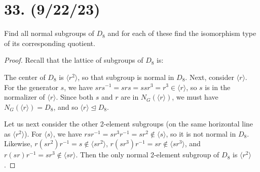 \documentclass{article}
\begin{document}
\section*{33. (9/22/23)}

Find all normal subgroups of $D_8$ and for each of these find the isomorphism type of its corresponding quotient.

\begin{proof}
    
Recall that the lattice of subgroups of $D_8$ is:

\begin{center}
\end{center}

The center of $D_8$ is $\langle r^2 \rangle$, so that subgroup is normal in $D_8$. Next, consider $\langle r \rangle$. For the generator $s$, we have $srs^{-1} = srs = ssr^3 = r^3 \in \langle r \rangle$, so $s$ is in the normalizer of $\langle r \rangle$. Since both $s$ and $r$ are in $N_G(\langle r \rangle)$, we must have $N_G(\langle r \rangle) = D_8$, and so $\langle r \rangle \unlhd D_8$.

Let us next consider the other 2-element subgroups (on the same horizontal line as $\langle r^2 \rangle$). For $\langle s \rangle$, we have $rsr^{-1} = sr^3r^{-1} = sr^2 \notin \langle s \rangle$, so it is not normal in $D_8$. Likewise, $r(sr^2)r^{-1} = s \notin \langle sr^2 \rangle$, $r(sr^3)r^{-1} = sr \notin \langle sr^3 \rangle$, and $r(sr)r^{-1} = sr^3 \notin \langle sr \rangle$. Then the only normal 2-element subgroup of $D_8$ is $\langle r^2 \rangle$.


\end{proof}
\end{document}
